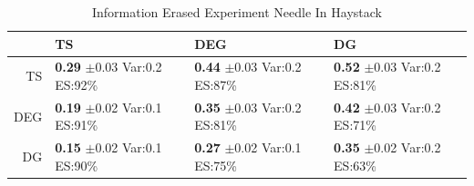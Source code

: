 \documentclass[11pt,letterpaper]{article}
\begin{document}
\begin{table}[H]
\centering
\caption{Information Erased Experiment Needle In Haystack} 
\begin{tabular}{rlll}
  \hline
 & TS & DEG &  DG \\ 
  \hline
TS & \makecell{\textbf{0.29} $\pm$0.03\\Var:0.2\\ES:92\%} & \makecell{\textbf{0.44} $\pm$0.03\\Var:0.2\\ES:87\%} & \makecell{\textbf{0.52} $\pm$0.03\\Var:0.2\\ES:81\%} \\ 
  DEG & \makecell{\textbf{0.19} $\pm$0.02\\Var:0.1\\ES:91\%} & \makecell{\textbf{0.35} $\pm$0.03\\Var:0.2\\ES:81\%} & \makecell{\textbf{0.42} $\pm$0.03\\Var:0.2\\ES:71\%} \\ 
   DG & \makecell{\textbf{0.15} $\pm$0.02\\Var:0.1\\ES:90\%} & \makecell{\textbf{0.27} $\pm$0.02\\Var:0.1\\ES:75\%} & \makecell{\textbf{0.35} $\pm$0.02\\Var:0.2\\ES:63\%} \\ 
   \hline
\end{tabular}
\end{table}
\end{document}

